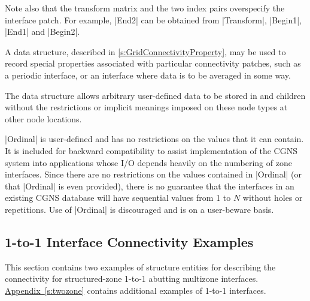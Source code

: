 Note also that the transform matrix and the two index pairs overspecify the
interface patch.  For example, |End2| can be obtained from |Transform|,
|Begin1|, |End1| and |Begin2|.

A  data structure, described in
\autoref{s:GridConnectivityProperty}, may be used to record special
properties associated with particular connectivity patches, such as a
periodic interface, or an interface where data is to be averaged in some
way.

The  data structure allows arbitrary
user-defined data to be stored in  and
 children without the restrictions or implicit
meanings imposed on these node types at other node locations.

|Ordinal| is user-defined and has no restrictions on the values that it can
contain.  It is included for backward compatibility to assist implementation
of the CGNS system into applications whose I/O depends heavily on the
numbering of zone interfaces.  Since there are no restrictions on the values
contained in |Ordinal| (or that |Ordinal| is even provided), there is no
guarantee that the interfaces in an existing CGNS database
will have sequential values from 1 to $N$ without holes or repetitions.  Use
of |Ordinal| is discouraged and is on a user-beware basis.

\subsection{1-to-1 Interface Connectivity Examples}
\label{s:cnct_example}

This section contains two examples of structure entities for describing
the connectivity for struc\-tured-zone 1-to-1 abutting multizone
interfaces.
\hyperref[s:twozone]{Appendix~\ref*{s:twozone}} contains additional
examples of 1-to-1 interfaces.

